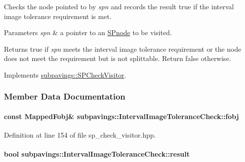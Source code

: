\-Checks the node pointed to by {\itshape spn\/} and records the result true if the interval image tolerance requirement is met.


\begin{DoxyParams}{\-Parameters}
{\em spn} & a pointer to an \hyperlink{classsubpavings_1_1SPnode}{\-S\-Pnode} to be visited. \\
\hline
\end{DoxyParams}
\begin{DoxyReturn}{\-Returns}
true if {\itshape spn\/} meets the interval image tolerance requirement or the node does not meet the requirement but is not splittable. \-Return false otherwise. 
\end{DoxyReturn}


\-Implements \hyperlink{classsubpavings_1_1SPCheckVisitor_ad5fd0bde6d256676290e790c6387f01a}{subpavings\-::\-S\-P\-Check\-Visitor}.



\subsubsection{\-Member \-Data \-Documentation}
\hypertarget{classsubpavings_1_1IntervalImageToleranceCheck_a596c18c976319d44ac404059b89f6226}{
\paragraph[{fobj}]{\setlength{\rightskip}{0pt plus 5cm}const {\bf \-Mapped\-Fobj}\& {\bf subpavings\-::\-Interval\-Image\-Tolerance\-Check\-::fobj}}}\label{classsubpavings_1_1IntervalImageToleranceCheck_a596c18c976319d44ac404059b89f6226}


\-Definition at line 154 of file sp\-\_\-check\-\_\-visitor.\-hpp.

\hypertarget{classsubpavings_1_1IntervalImageToleranceCheck_acde9d9bfcbfc1d39c3546aa3a1772374}{
\paragraph[{result}]{\setlength{\rightskip}{0pt plus 5cm}bool {\bf subpavings\-::\-Interval\-Image\-Tolerance\-Check\-::result}}}\label{classsubpavings_1_1IntervalImageToleranceCheck_acde9d9bfcbfc1d39c3546aa3a1772374}



